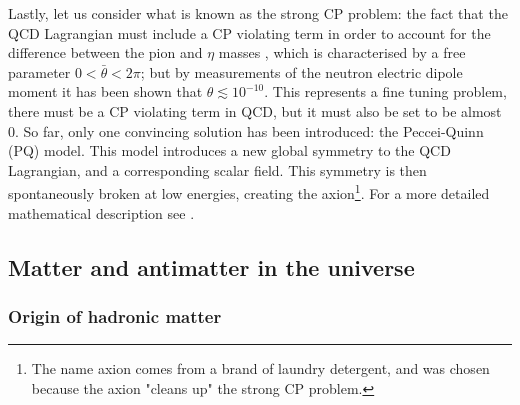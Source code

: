 Lastly, let us consider what is known as the strong CP problem: the fact that the QCD Lagrangian must include a CP violating term in order to account for the difference between the pion and $\eta$ masses \cite{tHooft}, which is characterised by a free parameter $0<\bar{\theta}<2\pi$; but by measurements of the neutron electric dipole moment it has been shown that $\theta \lesssim 10^{-10}$. This represents a fine tuning problem, there must be a CP violating term in QCD, but it must also be set to be almost 0. So far, only one convincing solution has been introduced: the Peccei-Quinn (PQ) model. This model introduces a new global symmetry to the QCD Lagrangian, and a corresponding scalar field. This symmetry is then spontaneously broken at low energies, creating the axion\footnote{The name axion comes from a brand of laundry detergent, and was chosen because the axion "cleans up" the strong CP problem.}. For a more detailed mathematical description see \cite{axion_review}.


\subsection{Matter and antimatter in the universe}


\subsubsection{Origin of hadronic matter}

